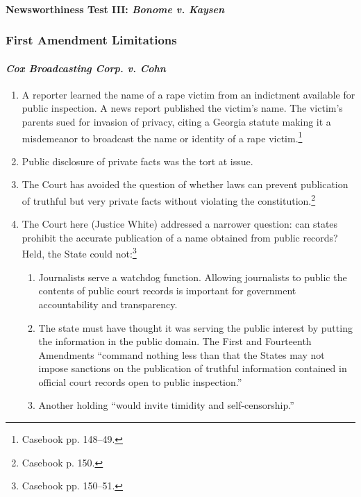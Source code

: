 
\paragraph{Newsworthiness Test III: \emph{Bonome v. Kaysen}}


\subsubsection{First Amendment Limitations}

\paragraph{\emph{Cox Broadcasting Corp. v. Cohn}}

\begin{enumerate}
    \item A reporter learned the name of a rape victim from an indictment 
    available for public inspection. A news report published the victim's name. 
    The victim's parents sued for invasion of privacy, citing a Georgia statute 
    making it a misdemeanor to broadcast the name or identity of a rape 
    victim.\footnote{Casebook pp.  148--49.}
    \item Public disclosure of private facts was the tort at issue.
    \item The Court has avoided the question of whether laws can prevent 
    publication of truthful but very private facts without violating the 
    constitution.\footnote{Casebook p. 150.}
    \item The Court here (Justice White) addressed a narrower question: can 
    states prohibit the accurate publication of a name obtained from public 
    records? Held, the State could not:\footnote{Casebook pp. 150--51.}
    \begin{enumerate}
        \item Journalists serve a watchdog function. Allowing journalists to 
        public the contents of public court records is important for government 
        accountability and transparency.
        \item The state must have thought it was serving the public interest by 
        putting the information in the public domain. The First and Fourteenth 
        Amendments ``command nothing less than that the States may not impose 
        sanctions on the publication of truthful information contained in 
        official court records open to public inspection.''
        \item Another holding ``would invite timidity and self-censorship.''
    \end{enumerate}
\end{enumerate}


